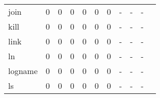 \begin{longtable}{lp{1.2cm}p{1.2cm}p{1.2cm}p{1.2cm}p{1.2cm}p{1.2cm}p{1.2cm}p{1.2cm}p{1.2cm}p{1.2cm}}
join      &                                     0 &                                                  0 &                                                  0 &                                                  0 &                                                  0 &                                                  0 &                                             - &                                                  - &                                                  - \\
kill      &                                     0 &                                                  0 &                                                  0 &                                                  0 &                                                  0 &                                                  0 &                                             - &                                                  - &                                                  - \\
link      &                                     0 &                                                  0 &                                                  0 &                                                  0 &                                                  0 &                                                  0 &                                             - &                                                  - &                                                  - \\
ln        &                                     0 &                                                  0 &                                                  0 &                                                  0 &                                                  0 &                                                  0 &                                             - &                                                  - &                                                  - \\
logname   &                                     0 &                                                  0 &                                                  0 &                                                  0 &                                                  0 &                                                  0 &                                             - &                                                  - &                                                  - \\
ls        &                                     0 &                                                  0 &                                                  0 &                                                  0 &                                                  0 &                                                  0 &                                             - &                                                  - &                                                  - \\

\end{longtable}
